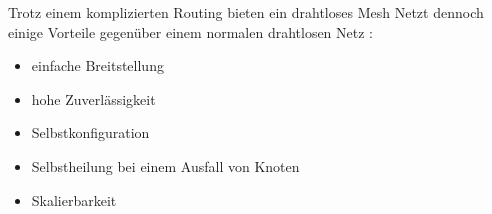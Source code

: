 Trotz einem komplizierten Routing bieten ein drahtloses Mesh Netzt dennoch einige Vorteile gegenüber einem normalen drahtlosen Netz \cite{vijayakumar2012review}:
\begin{itemize}
	\item einfache Breitstellung
	\item hohe Zuverlässigkeit
	\item Selbstkonfiguration
	\item Selbstheilung bei einem Ausfall von Knoten
	\item Skalierbarkeit
\end{itemize}
